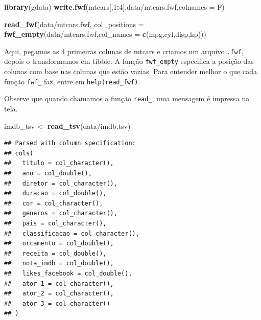 \documentclass[
]{book}
\newenvironment{Shaded}{\begin{snugshade}}{\end{snugshade}}
\newcommand{\DataTypeTok}[1]{\textcolor[rgb]{0.13,0.29,0.53}{#1}}
\newcommand{\DecValTok}[1]{\textcolor[rgb]{0.00,0.00,0.81}{#1}}
\newcommand{\KeywordTok}[1]{\textcolor[rgb]{0.13,0.29,0.53}{\textbf{#1}}}
\newcommand{\NormalTok}[1]{#1}
\newcommand{\OperatorTok}[1]{\textcolor[rgb]{0.81,0.36,0.00}{\textbf{#1}}}
\newcommand{\StringTok}[1]{\textcolor[rgb]{0.31,0.60,0.02}{#1}}
\begin{document}
\begin{Shaded}
\begin{Highlighting}[]
\KeywordTok{library}\NormalTok{(gdata)}
\KeywordTok{write.fwf}\NormalTok{(mtcars[,}\DecValTok{1}\OperatorTok{:}\DecValTok{4}\NormalTok{],}\StringTok{\textquotesingle{}data/mtcars.fwf\textquotesingle{}}\NormalTok{,}\DataTypeTok{colnames =}\NormalTok{ F)}

\KeywordTok{read\_fwf}\NormalTok{(}\StringTok{\textquotesingle{}data/mtcars.fwf\textquotesingle{}}\NormalTok{, }\DataTypeTok{col\_positions =} \KeywordTok{fwf\_empty}\NormalTok{(}\StringTok{\textquotesingle{}data/mtcars.fwf\textquotesingle{}}\NormalTok{,}\DataTypeTok{col\_names =} \KeywordTok{c}\NormalTok{(}\StringTok{\textquotesingle{}mpg\textquotesingle{}}\NormalTok{,}\StringTok{\textquotesingle{}cyl\textquotesingle{}}\NormalTok{,}\StringTok{\textquotesingle{}disp\textquotesingle{}}\NormalTok{,}\StringTok{\textquotesingle{}hp\textquotesingle{}}\NormalTok{)))}
\end{Highlighting}
\end{Shaded}

Aqui, pegamos as 4 primeiras colunas de mtcars e criamos um arquivo \texttt{.fwf}, depois o transformamos em tibble. A função \texttt{fwf\_empty} especifica a posição das colunas com base nas colunas que estão vazias. Para entender melhor o que cada função \texttt{fwf\_} faz, entre em \texttt{help(read\_fwf)}.

Observe que quando chamamos a função \texttt{read\_}, uma mensagem é impressa na tela.

\begin{Shaded}
\begin{Highlighting}[]
\NormalTok{imdb\_tsv <{-}}\StringTok{ }\KeywordTok{read\_tsv}\NormalTok{(}\StringTok{\textquotesingle{}data/imdb.tsv\textquotesingle{}}\NormalTok{)}
\end{Highlighting}
\end{Shaded}

\begin{verbatim}
## Parsed with column specification:
## cols(
##   titulo = col_character(),
##   ano = col_double(),
##   diretor = col_character(),
##   duracao = col_double(),
##   cor = col_character(),
##   generos = col_character(),
##   pais = col_character(),
##   classificacao = col_character(),
##   orcamento = col_double(),
##   receita = col_double(),
##   nota_imdb = col_double(),
##   likes_facebook = col_double(),
##   ator_1 = col_character(),
##   ator_2 = col_character(),
##   ator_3 = col_character()
## )
\end{verbatim}
\end{document}
